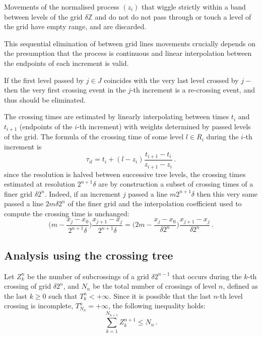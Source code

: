 \documentclass[a4paper]{article}
\begin{document}

Movements of the normalised process $(z_i)$ that wiggle strictly within a band between
levels of the grid $\delta \mathbb{Z}$ and do not do not pass through or touch a level
of the grid have empty range, and are discarded.

This sequential elimination of between grid lines movements crucially depends on
the presumption that the process is continuous and linear interpolation between
the endpoints of each increment is valid.

If the first level passed by $j\in J$ coincides with the very last level crossed
by $j-$ then the very first crossing event in the $j$-th increment is a re-crossing
event, and thus should be eliminated.

The crossing times are estimated by linearly interpolating between
times $t_i$ and $t_{i+1}$ (endpoints of the $i$-th increment) with weights determined
by passed levels of the grid. The formula of the crossing time of some level $l\in R_i$
during the $i$-th increment is
\[ \tau_{il} = t_i + (l - z_i) \frac{t_{i+1} - t_i}{z_{i+1} - z_i} \,. \]
since the resolution is
halved between successive tree levels, the crossing times estimated at resolution
$2^{n+1} \delta$ are by construction a subset of crossing times of a finer grid
$\delta 2^n$. Indeed, if an increment $j$ passed a line $m 2^{n+1} \delta$ then
this very same passed a line $2m \delta 2^n$ of the finer grid and the interpolation
coefficient used to compute the crossing time is unchanged:
\[
    \biggl( m - \frac{x_j - x_0}{2^{n+1} \delta} \biggr) \frac{x_{j+1} - x_j}{2^{n+1} \delta}
    = \biggl( 2m - \frac{x_j - x_0}{\delta 2^n} \biggr) \frac{x_{j+1} - x_j}{\delta 2^n} \,.
\]



\subsection{Analysis using the crossing tree} %
\label{sub:analysis_using_the_crossing_tree}

Let $Z_k^n$ be the number of subcrossings of a grid $\delta 2^{n-1}$ that occurs
during the $k$-th crossing of grid $\delta 2^n$, and $N_n$ be the total number
of crossings of level $n$, defined as the last $k\geq0$ such that
$T_k^n < +\infty$. Since it is possible that the last $n$-th level crossing is
incomplete, $T_{N_n}^n = +\infty$, the following inequality holds:
\[ \sum_{k=1}^{N_{n+1}} Z_k^{n+1} \leq N_n \,.\]
\end{document}
